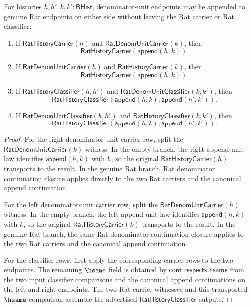 \begin{theorem}
\label{thm:rat-denom-unit-mixed-append-rat-closure-package}
For histories $h,h',k,k':\mathsf{BHist}$, denominator-unit endpoints may be
appended to genuine Rat endpoints on either side without leaving the Rat
carrier or Rat classifier:
\begin{enumerate}
\item If $\mathsf{RatHistoryCarrier}(h)$ and
$\mathsf{RatDenomUnitCarrier}(k)$, then
$$
\mathsf{RatHistoryCarrier}(\mathsf{append}(h,k)).
$$

\item If $\mathsf{RatDenomUnitCarrier}(h)$ and
$\mathsf{RatHistoryCarrier}(k)$, then
$$
\mathsf{RatHistoryCarrier}(\mathsf{append}(h,k)).
$$

\item If $\mathsf{RatHistoryClassifier}(h,h')$ and
$\mathsf{RatDenomUnitClassifier}(k,k')$, then
$$
\mathsf{RatHistoryClassifier}
  (\mathsf{append}(h,k),\mathsf{append}(h',k')).
$$

\item If $\mathsf{RatDenomUnitClassifier}(h,h')$ and
$\mathsf{RatHistoryClassifier}(k,k')$, then
$$
\mathsf{RatHistoryClassifier}
  (\mathsf{append}(h,k),\mathsf{append}(h',k')).
$$
\end{enumerate}
\end{theorem}
\begin{proof}
For the right denominator-unit carrier row, split the
$\mathsf{RatDenomUnitCarrier}(k)$ witness. In the empty branch, the right
append unit law identifies $\mathsf{append}(h,k)$ with $h$, so the original
$\mathsf{RatHistoryCarrier}(h)$ transports to the result. In the genuine Rat
branch, Rat denominator continuation closure applies directly to the two Rat
carriers and the canonical append continuation.

For the left denominator-unit carrier row, split the
$\mathsf{RatDenomUnitCarrier}(h)$ witness. In the empty branch, the left append
unit law identifies $\mathsf{append}(h,k)$ with $k$, so the original
$\mathsf{RatHistoryCarrier}(k)$ transports to the result. In the genuine Rat
branch, the same Rat denominator continuation closure applies to the two Rat
carriers and the canonical append continuation.

For the classifier rows, first apply the corresponding carrier rows to the two
endpoints. The remaining $\hsame$ field is obtained by
$\mathsf{cont\_respects\_hsame}$ from the two input classifier comparisons and
the canonical append continuations on the left and right endpoints. The two Rat
carrier witnesses and this transported $\hsame$ comparison assemble the
advertised $\mathsf{RatHistoryClassifier}$ outputs.
\end{proof}

